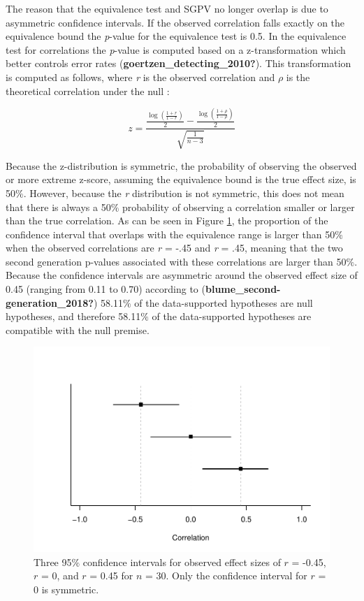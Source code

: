 \documentclass[
  english,
  man]{apa6}
\begin{document}
The reason that the equivalence test and SGPV no longer overlap is due to asymmetric confidence intervals. If the observed correlation falls exactly on the equivalence bound the \emph{p}-value for the equivalence test is 0.5. In the equivalence test for correlations the \emph{p}-value is computed based on a z-transformation which better controls error rates (\textbf{goertzen\_detecting\_2010?}). This transformation is computed as follows, where \emph{r} is the observed correlation and \(\rho\) is the theoretical correlation under the null :

\[
z = \frac{\frac{\log(\frac{1 + r}{ 1 - r})}{2} - \frac{\log(\frac{1 + \rho}{ 1 - \rho})}{2}}{\sqrt{\frac{1}{n-3}}}
\]

Because the z-distribution is symmetric, the probability of observing the observed or more extreme z-score, assuming the equivalence bound is the true effect size, is 50\(\%\). However, because the \emph{r} distribution is not symmetric, this does not mean that there is always a 50\(\%\) probability of observing a correlation smaller or larger than the true correlation. As can be seen in Figure \ref{fig:TOSTSGPV12}, the proportion of the confidence interval that overlaps with the equivalence range is larger than 50\(\%\) when the observed correlations are \emph{r} = -.45 and \emph{r} = .45, meaning that the two second generation p-values associated with these correlations are larger than 50\(\%\). Because the confidence intervals are asymmetric around the observed effect size of 0.45 (ranging from 0.11 to 0.70) according to (\textbf{blume\_second-generation\_2018?}) 58.11\(\%\) of the data-supported hypotheses are null hypotheses, and therefore 58.11\(\%\) of the data-supported hypotheses are compatible with the null premise.

\begin{figure}

{\centering \includegraphics[height=0.94\textheight]{chp5_format-Rmd_bib_files/figure-latex/TOSTSGPV12-1} 

}

\caption{Three 95$\%$ confidence intervals for observed effect sizes of $r$ = -0.45, $r$ = 0, and $r$ = 0.45 for $n$ = 30. Only the confidence interval for $r$ = 0 is symmetric.}\label{fig:TOSTSGPV12}
\end{figure}
\end{document}
